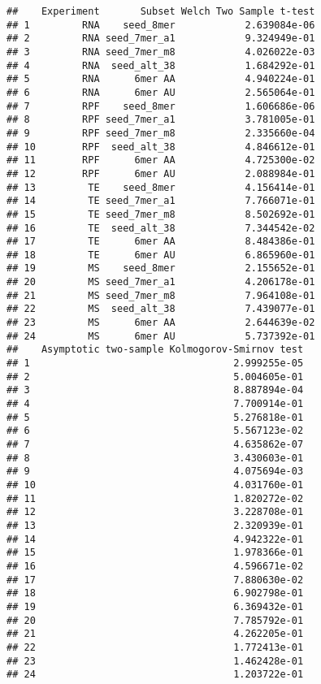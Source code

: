 \documentclass[
]{article}
\begin{document}
\begin{verbatim}
##    Experiment       Subset Welch Two Sample t-test
## 1         RNA    seed_8mer            2.639084e-06
## 2         RNA seed_7mer_a1            9.324949e-01
## 3         RNA seed_7mer_m8            4.026022e-03
## 4         RNA  seed_alt_38            1.684292e-01
## 5         RNA      6mer AA            4.940224e-01
## 6         RNA      6mer AU            2.565064e-01
## 7         RPF    seed_8mer            1.606686e-06
## 8         RPF seed_7mer_a1            3.781005e-01
## 9         RPF seed_7mer_m8            2.335660e-04
## 10        RPF  seed_alt_38            4.846612e-01
## 11        RPF      6mer AA            4.725300e-02
## 12        RPF      6mer AU            2.088984e-01
## 13         TE    seed_8mer            4.156414e-01
## 14         TE seed_7mer_a1            7.766071e-01
## 15         TE seed_7mer_m8            8.502692e-01
## 16         TE  seed_alt_38            7.344542e-02
## 17         TE      6mer AA            8.484386e-01
## 18         TE      6mer AU            6.865960e-01
## 19         MS    seed_8mer            2.155652e-01
## 20         MS seed_7mer_a1            4.206178e-01
## 21         MS seed_7mer_m8            7.964108e-01
## 22         MS  seed_alt_38            7.439077e-01
## 23         MS      6mer AA            2.644639e-02
## 24         MS      6mer AU            5.737392e-01
##    Asymptotic two-sample Kolmogorov-Smirnov test
## 1                                   2.999255e-05
## 2                                   5.004605e-01
## 3                                   8.887894e-04
## 4                                   7.700914e-01
## 5                                   5.276818e-01
## 6                                   5.567123e-02
## 7                                   4.635862e-07
## 8                                   3.430603e-01
## 9                                   4.075694e-03
## 10                                  4.031760e-01
## 11                                  1.820272e-02
## 12                                  3.228708e-01
## 13                                  2.320939e-01
## 14                                  4.942322e-01
## 15                                  1.978366e-01
## 16                                  4.596671e-02
## 17                                  7.880630e-02
## 18                                  6.902798e-01
## 19                                  6.369432e-01
## 20                                  7.785792e-01
## 21                                  4.262205e-01
## 22                                  1.772413e-01
## 23                                  1.462428e-01
## 24                                  1.203722e-01
\end{verbatim}
\end{document}
